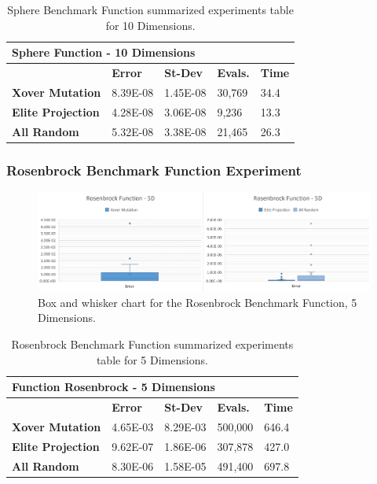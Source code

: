 \documentclass[graybox]{svmult}
\begin{document}
    \begin{table}[]
        \scriptsize
        \centering
        \caption{Sphere Benchmark Function summarized experiments table for 10 Dimensions.}\label{tab.fun_sphere10}
        \begin{tabular}{@{}lllll@{}}
        \toprule
        \multicolumn{5}{l}{\textbf{Sphere Function - 10 Dimensions}} \\ \midrule
        & \textbf{Error} & \textbf{St-Dev} & \textbf{Evals.} & \textbf{Time} \\
        \textbf{Xover Mutation} & 8.39E-08 & 1.45E-08 & 30,769 & 34.4 \\
        \textbf{Elite Projection} & 4.28E-08 & 3.06E-08 & 9,236 & 13.3 \\
        \textbf{All Random} & 5.32E-08 & 3.38E-08 & 21,465 & 26.3 \\ \bottomrule
        \end{tabular}
        \end{table}


\subsubsection{Rosenbrock Benchmark Function Experiment}

    \begin{figure}
        \includegraphics[width=\linewidth, frame]{img/fig_fun_rosenbrock_5d.pdf}
        \caption{Box and whisker chart for the Rosenbrock Benchmark Function, 5 Dimensions.} \label{fig.fun_rosenbrock_5d}
        \end{figure}

    \begin{table}[]
        \scriptsize
        \centering
        \caption{Rosenbrock Benchmark Function summarized experiments table for 5 Dimensions.}\label{tab.fun_rosenbrock5}
        \begin{tabular}{@{}lllll@{}}
        \toprule
        \multicolumn{5}{l}{\textbf{Function Rosenbrock - 5 Dimensions}} \\ \midrule
        & \textbf{Error} & \textbf{St-Dev} & \textbf{Evals.} & \textbf{Time} \\
        \textbf{Xover Mutation} & 4.65E-03 & 8.29E-03 & 500,000 & 646.4 \\
        \textbf{Elite Projection} & 9.62E-07 & 1.86E-06 & 307,878 & 427.0 \\
        \textbf{All Random} & 8.30E-06 & 1.58E-05 & 491,400 & 697.8 \\ \bottomrule
        \end{tabular}
        \end{table}
\end{document}
